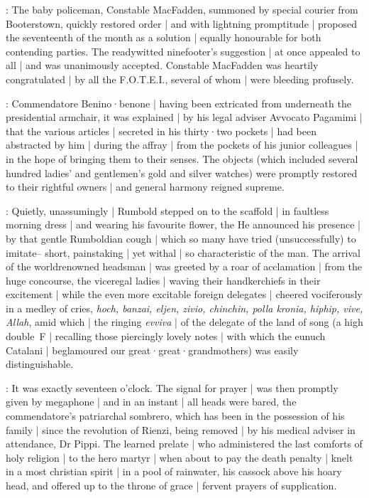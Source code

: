 :
The baby policeman,
Constable MacFadden,
summoned by special courier from Booterstown,
quickly restored order |
and with lightning promptitude |
proposed the seventeenth of the month
as a solution |
equally honourable for both contending parties.
The readywitted ninefooter's suggestion |
at once appealed to all |
and was unanimously accepted.
Constable MacFadden was heartily congratulated |
by all the F.O.T.E.I.,
several of whom |
were bleeding profusely.

:
Commendatore Benino·benone |
having been extricated from underneath the presidential armchair,
it was explained |
by his legal adviser Avvocato Pagamimi |
that the various articles |
secreted in his thirty·two pockets |
had been abstracted by him |
during the affray |
from the pockets of his junior colleagues |
in the hope of bringing them to their senses.
The objects
(which included several hundred ladies' and gentlemen's gold and silver watches)
were promptly restored to their rightful owners |
and general harmony reigned supreme.

:
Quietly, unassumingly |
Rumbold stepped on to the scaffold |
in faultless morning dress |
and wearing his favourite flower,
the 
He announced his presence |
by that gentle Rumboldian cough |
which so many have tried (unsuccessfully) to imitate--%
short,
painstaking |
yet withal |
so characteristic of the man.
The arrival of the worldrenowned headsman |
was greeted by a roar of acclamation |
from the huge concourse,
the viceregal ladies |
waving their handkerchiefs in their excitement |
while the even more excitable foreign delegates |
cheered vociferously in a medley of cries,
\emph{hoch,
banzai,
eljen,
zivio,
chinchin,
polla kronia,
hiphip,
vive,
Allah},
amid which |
the ringing \emph{evviva} |
of the delegate of the land of song
(a high double~F |
recalling those piercingly lovely notes |
with which the eunuch Catalani |
beglamoured our great·great·grandmothers)
was easily distinguishable.

:
It was exactly seventeen o'clock.
The signal for prayer |
was then promptly given by megaphone |
and in an instant |
all heads were bared,
the commendatore's patriarchal sombrero,
which has been in the possession of his family |
since the revolution of Rienzi,
being removed |
by his medical adviser in attendance,
Dr Pippi.
The learned prelate |
who administered the last comforts of holy religion |
to the hero martyr |
when about to pay the death penalty |
knelt in a most christian spirit |
in a pool of rainwater,
his cassock above his hoary head,
and offered up to the throne of grace |
fervent prayers of supplication.

